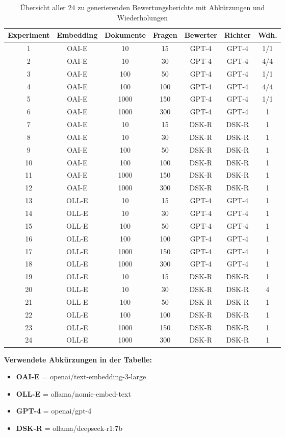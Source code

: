 \begin{table}[htbp]
    \centering
    \begin{tabular}{|c|c|c|c|c|c|c|}
        \hline
        \textbf{Experiment} & \textbf{Embedding} & \textbf{Dokumente} & \textbf{Fragen} & \textbf{Bewerter} & \textbf{Richter} & \textbf{Wdh.} \\
        \hline
        1  & OAI-E & 10   & 15  & GPT-4 & GPT-4 & 1/1 \\
        2  & OAI-E & 10   & 30  & GPT-4 & GPT-4 & 4/4 \\
        3  & OAI-E & 100  & 50  & GPT-4 & GPT-4 & 1/1 \\
        4  & OAI-E & 100  & 100 & GPT-4 & GPT-4 & 4/4 \\
        5  & OAI-E & 1000 & 150 & GPT-4 & GPT-4 & 1/1 \\
        6  & OAI-E & 1000 & 300 & GPT-4 & GPT-4 & 1 \\
        \hline
        7  & OAI-E & 10   & 15  & DSK-R & DSK-R & 1 \\
        8  & OAI-E & 10   & 30  & DSK-R & DSK-R & 1 \\
        9  & OAI-E & 100  & 50  & DSK-R & DSK-R & 1 \\
        10 & OAI-E & 100  & 100 & DSK-R & DSK-R & 1 \\
        11 & OAI-E & 1000 & 150 & DSK-R & DSK-R & 1 \\
        12 & OAI-E & 1000 & 300 & DSK-R & DSK-R & 1 \\
        \hline
        13 & OLL-E & 10   & 15  & GPT-4 & GPT-4 & 1 \\
        14 & OLL-E & 10   & 30  & GPT-4 & GPT-4 & 1 \\
        15 & OLL-E & 100  & 50  & GPT-4 & GPT-4 & 1 \\
        16 & OLL-E & 100  & 100 & GPT-4 & GPT-4 & 1 \\
        17 & OLL-E & 1000 & 150 & GPT-4 & GPT-4 & 1 \\
        18 & OLL-E & 1000 & 300 & GPT-4 & GPT-4 & 1 \\
        \hline
        19 & OLL-E & 10   & 15  & DSK-R & DSK-R & 1 \\
        20 & OLL-E & 10   & 30  & DSK-R & DSK-R & 4 \\
        21 & OLL-E & 100  & 50  & DSK-R & DSK-R & 1 \\
        22 & OLL-E & 100  & 100 & DSK-R & DSK-R & 1 \\
        23 & OLL-E & 1000 & 150 & DSK-R & DSK-R & 1 \\
        24 & OLL-E & 1000 & 300 & DSK-R & DSK-R & 1 \\
        \hline
    \end{tabular}
    \caption{Übersicht aller 24 zu generierenden Bewertungsberichte mit Abkürzungen und Wiederholungen}
    \label{tab:bewertungsberichte}
\end{table}

\noindent
\textbf{Verwendete Abkürzungen in der Tabelle:}
\begin{itemize}
    \item \textbf{OAI-E} = openai/text-embedding-3-large
    \item \textbf{OLL-E} = ollama/nomic-embed-text
    \item \textbf{GPT-4} = openai/gpt-4
    \item \textbf{DSK-R} = ollama/deepseek-r1:7b
\end{itemize} 